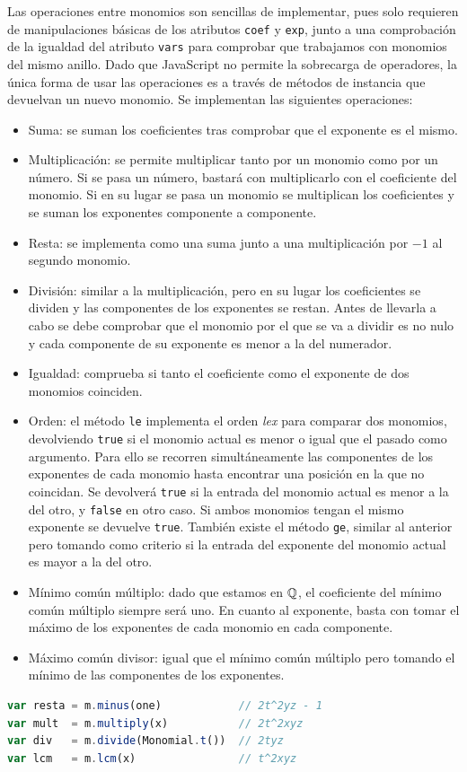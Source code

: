 Las operaciones entre monomios son sencillas de implementar, pues solo requieren de manipulaciones básicas de los atributos \texttt{coef} y \texttt{exp}, junto a una comprobación de la igualdad del atributo \texttt{vars} para comprobar que trabajamos con monomios del mismo anillo. Dado que JavaScript no permite la sobrecarga de operadores, la única forma de usar las operaciones es a través de métodos de instancia que devuelvan un nuevo monomio. Se implementan las siguientes operaciones:
\begin{itemize}
    \item Suma: se suman los coeficientes tras comprobar que el exponente es el mismo.
    \item Multiplicación: se permite multiplicar tanto por un monomio como por un número. Si se pasa un número, bastará con multiplicarlo con el coeficiente del monomio. Si en su lugar se pasa un monomio se multiplican los coeficientes y se suman los exponentes componente a componente.
    \item Resta: se implementa como una suma junto a una multiplicación por $-1$ al segundo monomio.
    \item División: similar a la multiplicación, pero en su lugar los coeficientes se dividen y las componentes de los exponentes se restan. Antes de llevarla a cabo se debe comprobar que el monomio por el que se va a dividir es no nulo y cada componente de su exponente es menor a la del numerador.
    \item Igualdad: comprueba si tanto el coeficiente como el exponente de dos monomios coinciden.
    \item Orden: el método \texttt{le} implementa el orden \textit{lex} para comparar dos monomios, devolviendo \texttt{true} si el monomio actual es menor o igual que el pasado como argumento. Para ello se recorren simultáneamente las componentes de los exponentes de cada monomio hasta encontrar una posición en la que no coincidan. Se devolverá \texttt{true} si la entrada del monomio actual es menor a la del otro, y \texttt{false} en otro caso. Si ambos monomios tengan el mismo exponente se devuelve \texttt{true}. También existe el método \texttt{ge}, similar al anterior pero tomando como criterio si la entrada del exponente del monomio actual es mayor a la del otro.
    \item Mínimo común múltiplo: dado que estamos en $\mathbb{Q}$, el coeficiente del mínimo común múltiplo siempre será uno. En cuanto al exponente, basta con tomar el máximo de los exponentes de cada monomio en cada componente.
    \item Máximo común divisor: igual que el mínimo común múltiplo pero tomando el mínimo de las componentes de los exponentes.
\end{itemize}
\begin{lstlisting}[language=Javascript]
var resta = m.minus(one)            // 2t^2yz - 1
var mult  = m.multiply(x)           // 2t^2xyz
var div   = m.divide(Monomial.t())  // 2tyz
var lcm   = m.lcm(x)                // t^2xyz
\end{lstlisting}

